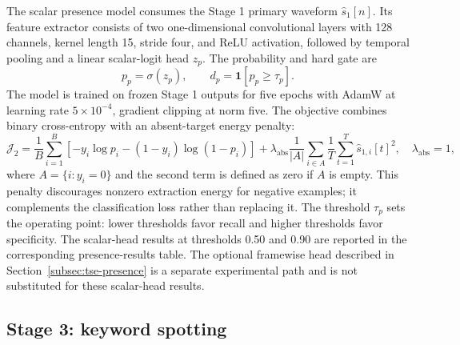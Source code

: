The scalar presence model consumes the Stage 1 primary waveform $\hat{s}_1[n]$. Its feature extractor consists of two one-dimensional convolutional layers with 128 channels, kernel length 15, stride four, and ReLU activation, followed by temporal pooling and a linear scalar-logit head $z_p$. The probability and hard gate are
\begin{equation}
  p_p=\sigma(z_p),\qquad d_p=\mathbf{1}[p_p\geq\tau_p].
  \label{eq:method-stage2-gate}
\end{equation}
The model is trained on frozen Stage 1 outputs for five epochs with AdamW at learning rate $5\times10^{-4}$, gradient clipping at norm five. The objective combines binary cross-entropy with an absent-target energy penalty:
\begin{equation}
  \mathcal{J}_2=\frac{1}{B}\sum_{i=1}^{B}\left[-y_i\log p_i-(1-y_i)\log(1-p_i)\right]
  +\lambda_{\mathrm{abs}}\frac{1}{|A|}\sum_{i\in A}\frac{1}{T}\sum_{t=1}^{T}\hat{s}_{1,i}[t]^2,
  \quad \lambda_{\mathrm{abs}}=1,
  \label{eq:method-stage2-loss}
\end{equation}
where $A=\{i:y_i=0\}$ and the second term is defined as zero if $A$ is empty. This penalty discourages nonzero extraction energy for negative examples; it complements the classification loss rather than replacing it. The threshold $\tau_p$ sets the operating point: lower thresholds favor recall and higher thresholds favor specificity. The scalar-head results at thresholds 0.50 and 0.90 are reported in the corresponding presence-results table. The optional framewise head described in Section~\ref{subsec:tse-presence} is a separate experimental path and is not substituted for these scalar-head results.

\subsection{Stage 3: keyword spotting}
\label{subsec:method-stage3}

